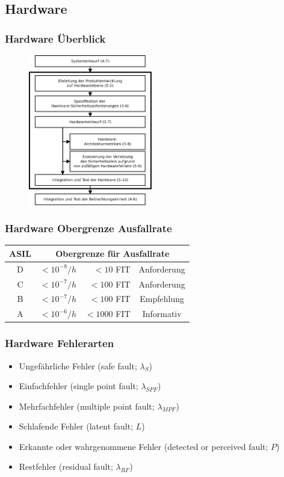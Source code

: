 \documentclass[]{beamer}
\begin{document}
\subsection{Hardware}
\begin{frame}
\frametitle{Hardware Überblick}

\begin{figure}
   \includegraphics[width=5.4cm]{Abb_6_4}
\end{figure}

\end{frame}

\begin{frame}
\frametitle{Hardware Obergrenze Ausfallrate}

\begin{center}
\begin{tabular}[h]{c r r c}
\toprule
ASIL & \multicolumn{3}{c}{Obergrenze für Ausfallrate}\\
\midrule
D & $ <10^{-8}/h $ & $ <10 $ FIT & Anforderung\\
C & $ <10^{-7}/h $ & $ <100 $ FIT   & Anforderung\\
B & $ <10^{-7}/h $ & $ <100 $ FIT   & Empfehlung\\
A & $ <10^{-6}/h $ & $ <1000 $ FIT   & Informativ\\
\bottomrule
\end{tabular}
\end{center}

\end{frame}

\begin{frame}
\frametitle{Hardware Fehlerarten}

\begin{itemize}
    \item Ungefährliche Fehler (safe fault; $ \lambda_S $)
    \item Einfachfehler (single point fault; $ \lambda_{SPF} $)
    \item Mehrfachfehler (multiple point fault; $ \lambda_{MPF} $)
    \item Schlafende Fehler (latent fault; $ L $)
    \item Erkannte oder wahrgenommene Fehler (detected or perceived fault; $ P $)
    \item Restfehler (residual fault; $ \lambda_{RF} $)
\end{itemize}

\end{frame}
\end{document}
